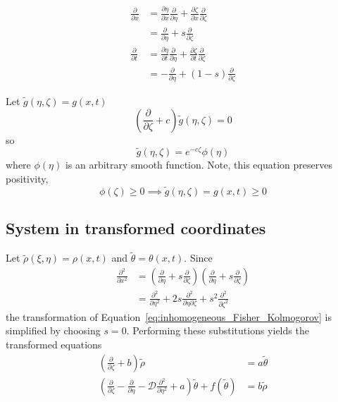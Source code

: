\documentclass[12pt]{amsart}
\begin{document}
\begin{align}
  \frac{\partial}{\partial x} & = \frac{\partial\eta}{\partial x}\frac{\partial}{\partial\eta} +
  \frac{\partial\zeta}{\partial x}\frac{\partial}{\partial\zeta} \\
  &= \frac{\partial}{\partial\eta} + s \frac{\partial}{\partial\zeta} \\
  \frac{\partial}{\partial t} & = \frac{\partial\eta}{\partial t}\frac{\partial}{\partial\eta} +
  \frac{\partial\zeta}{\partial t}\frac{\partial}{\partial\zeta}\\
  &= -\frac{\partial}{\partial\eta} + (1-s) \frac{\partial}{\partial\zeta} 
\end{align}

Let $\tilde{g}(\eta, \zeta) = g(x, t)$
\begin{equation}
  \left(\frac{\partial}{\partial\zeta} + c\right)\tilde{g}(\eta, \zeta) = 0
\end{equation}
so
\begin{equation}
\tilde{g}(\eta, \zeta) = e^{-c\zeta}\phi(\eta)  
\end{equation}
where $\phi(\eta)$ is an arbitrary smooth function.  Note, this equation preserves positivity,
\begin{equation}
  \phi(\zeta)\ge 0 \implies \tilde{g}(\eta, \zeta)=g(x, t)\ge 0
\end{equation}

\subsection{System in transformed coordinates}

Let $\tilde{\rho}(\xi, \eta) = \rho(x, t)$ and $\tilde{\theta} = \theta(x, t)$.  Since
\begin{align}
  \frac{\partial^2}{\partial x^2} & = \left(\frac{\partial}{\partial\eta} + s \frac{\partial}{\partial\zeta}\right)\left(\frac{\partial}{\partial\eta} + s \frac{\partial}{\partial\zeta}\right) \\
  &= \frac{\partial^2}{\partial\eta^2} + 2s \frac{\partial^2}{\partial\eta\partial\zeta} + s^2\frac{\partial^2}{\partial\zeta^2}
\end{align}
the transformation of Equation~\ref{eq:inhomogeneous_Fisher_Kolmogorov} is simplified by choosing $s=0$.
Performing these substitutions yields the transformed equations
\begin{align}
  \left(\frac{\partial}{\partial\zeta}+b\right)\tilde{\rho} &= a\tilde{\theta} \label{eq:transformed_balance_law}\\
  \left(\frac{\partial}{\partial\zeta}-\frac{\partial}{\partial\eta}-
  \mathcal{D}\frac{\partial^2}{\partial\eta^2}+a\right)\tilde{\theta} + f(\tilde{\theta}) &= b\tilde{\rho}
  \label{eq:transformed_inhomogeneous_Fisher_Kolmogorov}
\end{align}
\end{document}
